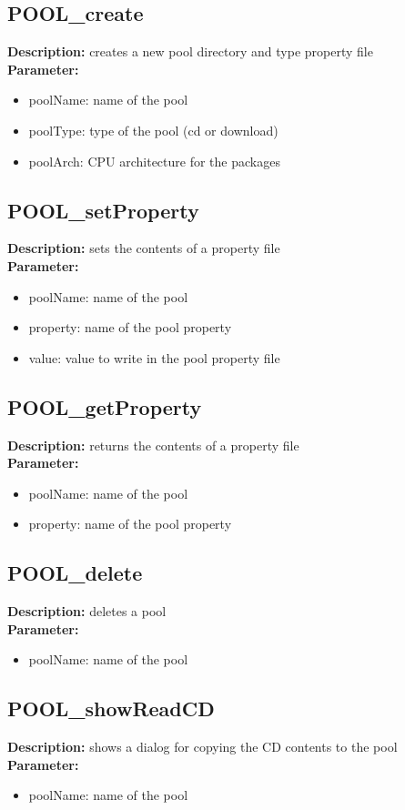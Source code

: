 \subsection{POOL\_create}
\textbf{Description:} creates a new pool directory and type property file\\
\textbf{Parameter:}
\begin{itemize}
\item poolName: name of the pool
\item poolType: type of the pool (cd or download)
\item poolArch: CPU architecture for the packages
\end{itemize}

\subsection{POOL\_setProperty}
\textbf{Description:} sets the contents of a property file\\
\textbf{Parameter:}
\begin{itemize}
\item poolName: name of the pool
\item property: name of the pool property
\item value: value to write in the pool property file
\end{itemize}

\subsection{POOL\_getProperty}
\textbf{Description:} returns the contents of a property file\\
\textbf{Parameter:}
\begin{itemize}
\item poolName: name of the pool
\item property: name of the pool property
\end{itemize}

\subsection{POOL\_delete}
\textbf{Description:} deletes a pool\\
\textbf{Parameter:}
\begin{itemize}
\item poolName: name of the pool
\end{itemize}

\subsection{POOL\_showReadCD}
\textbf{Description:} shows a dialog for copying the CD contents to the pool\\
\textbf{Parameter:}
\begin{itemize}
\item poolName: name of the pool
\end{itemize}

